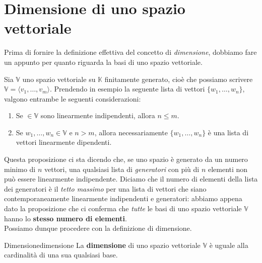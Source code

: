 \documentclass[12pt]{report}
\newcommand{\K}{\mathbb{K}}
\newcommand{\V}{\mathbb{V}}
\newcommand{\vectors}[1]{#1_1, \dots, #1_n}
\begin{document}
	\section{Dimensione di uno spazio vettoriale}
	Prima di fornire la definizione effettiva del concetto di \textit{dimensione}, dobbiamo fare un appunto per quanto riguarda la basi di uno spazio vettoriale.
	
	\begin{proposizione}{}{}
		Sia $\V$ uno spazio vettoriale su $\K$ finitamente generato, cioè che possiamo scrivere $\V = \langle v_1, \dots, v_m\rangle$.
		Prendendo in esempio la seguente lista di vettori $\{\vectors{w}\}$, valgono entrambe le seguenti considerazioni:
		\begin{enumerate}
			\item Se $ \in \V$ sono linearmente indipendenti, allora $n \leq m$.
			\item Se $\vectors{w} \in \V$ e $n > m$, allora necessariamente $\{\vectors{w}\}$ è una lista di vettori linearmente dipendenti.
		\end{enumerate}
	\end{proposizione}
	Questa proposizione ci sta dicendo che, se uno spazio è generato da un numero minimo di $n$ vettori, una qualsiasi lista di \textit{generatori} con più di $n$ elementi non può essere linearmente indipendente. Diciamo che il numero di elementi della lista dei generatori è il \textit{tetto massimo} per una lista di vettori che siano contemporaneamente linearmente indipendenti e generatori: abbiamo appena dato la proposizione che ci conferma che \textit{tutte} le basi di uno spazio vettoriale $\V$ hanno lo \textbf{stesso numero di elementi}.\\
	Possiamo dunque procedere con la definizione di dimensione.
	
	\begin{definizione}{Dimensione}{dimensione}
		La \textbf{dimensione} di uno spazio vettoriale $\V$ è uguale alla cardinalità di una sua qualsiasi base.
	\end{definizione}
	
\end{document}
